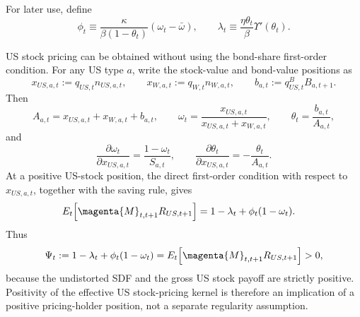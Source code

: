 \documentclass{article}
\def\green#1{#1}%
\begin{document}
For later use, define
\[
\phi_t
\equiv
\frac{\kappa}{\beta(1-\theta_t)}(\omega_t-\bar\omega),
\qquad
\lambda_t
\equiv
\frac{\eta\theta_t}{\beta}\Upsilon'(\theta_t).
\]

\green{US stock pricing can be obtained without using the bond-share first-order condition}.  \green{For any US type} $\green{a}$, \green{write the stock-value and bond-value positions as}
\[
\green{x}_{\green{US},\green{a},\green{t}}:\green{=q}_{\green{US},\green{t}}\green{n}_{\green{US},\green{a},\green{t}},
\qquad
\green{x}_{\green{W},\green{a},\green{t}}:\green{=q}_{\green{W},\green{t}}\green{n}_{\green{W},\green{a},\green{t}},
\qquad
\green{b}_{\green{a},\green{t}}:\green{=q}^\green{B}_{\green{US},\green{t}}\green{B}_{\green{a},\green{t+1}}.
\]
\green{Then}
\[
\green{A}_{\green{a},\green{t}}\green{=x}_{\green{US},\green{a},\green{t}}\green{+x}_{\green{W},\green{a},\green{t}}\green{+b}_{\green{a},\green{t}},
\qquad
\green{\omega}_\green{t=}\frac{\green{x}_{\green{US},\green{a},\green{t}}}{\green{x}_{\green{US},\green{a},\green{t}}\green{+x}_{\green{W},\green{a},\green{t}}},
\qquad
\green{\theta}_\green{t=}\frac{\green{b}_{\green{a},\green{t}}}{\green{A}_{\green{a},\green{t}}},
\]
\green{and}
\[
\frac{\green{\partial\omega}_\green{t}}{\green{\partial x}_{\green{US},\green{a},\green{t}}}
\green{=}\frac{\green{1-\omega}_\green{t}}{\green{S}_{\green{a},\green{t}}},
\qquad
\frac{\green{\partial\theta}_\green{t}}{\green{\partial x}_{\green{US},\green{a},\green{t}}}
\green{=-}\frac{\green{\theta}_\green{t}}{\green{A}_{\green{a},\green{t}}}.
\]
\green{At a positive US-stock position}, \green{the direct first-order condition with respect to} $\green{x}_{\green{US},\green{a},\green{t}}$, \green{together with the saving rule}, \green{gives}
\begin{align}
\green{E}_\green{t}\!\left[\magenta{\green{M}}_{\green{t},\green{t+1}}\green{R}_{\green{US},\green{t+1}}\right]
&\green{=}
\green{1-\lambda}_\green{t+\phi}_\green{t}(\green{1-\omega}_\green{t}).
\label{US_RUS_pricing}
\end{align}
\green{Thus}
\[
\green{\Psi}_\green{t}
:\green{=}
\green{1-\lambda}_\green{t+\phi}_\green{t}(\green{1-\omega}_\green{t})
\green{=E}_\green{t}\!\left[\magenta{\green{M}}_{\green{t},\green{t+1}}\green{R}_{\green{US},\green{t+1}}\right]\green{>0},
\]
\green{because the undistorted SDF and the gross US stock payoff are strictly positive}.  \green{Positivity of the effective US stock-pricing kernel is therefore an implication of a positive pricing-holder position}, \green{not a separate regularity assumption}.
\end{document}
